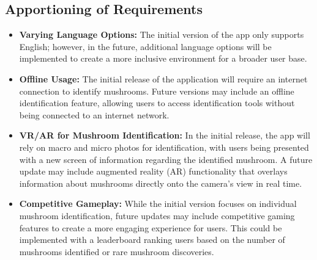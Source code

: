 \documentclass{article}
\begin{document}
\subsection{Apportioning of Requirements}
\label{sub:apportioning_of_requirements}
\begin{itemize}
	\item \textbf{Varying Language Options:} The initial version of the app only supports English; however, in the future, additional language options will be implemented to create a more inclusive environment for a broader user base.
	\item \textbf{Offline Usage:} The initial release of the application will require an internet connection to identify mushrooms. Future versions may include an offline identification feature, allowing users to access identification tools without being connected to an internet network.
	\item \textbf{VR/AR for Mushroom Identification:} In the initial release, the app will rely on macro and micro photos for identification, with users being presented with a new screen of information regarding the identified mushroom. A future update may include augmented reality (AR) functionality that overlays information about mushrooms directly onto the camera’s view in real time.
	\item \textbf{Competitive Gameplay:} While the initial version focuses on individual mushroom identification, future updates may include competitive gaming features to create a more engaging experience for users. This could be implemented with a leaderboard ranking users based on the number of mushrooms identified or rare mushroom discoveries.
\end{itemize}

\end{document}
